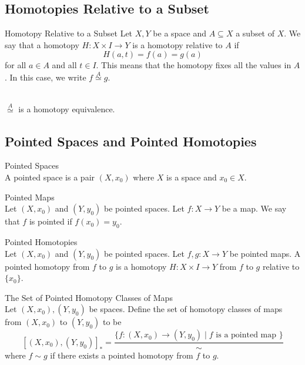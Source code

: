 \documentclass[a4paper]{article}
\begin{document}
\subsection{Homotopies Relative to a Subset}
\begin{defn}{Homotopy Relative to a Subset}{} Let $X,Y$ be a space and $A\subseteq X$ a subset of $X$. We say that a homotopy $H:X\times I\to Y$ is a homotopy relative to $A$ if $$H(a,t)=f(a)=g(a)$$ for all $a\in A$ and all $t\in I$. This means that the homotopy fixes all the values in $A$. In this case, we write $f\overset{A}{\simeq}g$. 
\end{defn}

\begin{prp}{}{}\\
$\overset{A}{\simeq}$ is a homotopy equivalence. 
\end{prp}

\subsection{Pointed Spaces and Pointed Homotopies}
\begin{defn}{Pointed Spaces}{}\\
A pointed space is a pair $(X,x_0)$ where $X$ is a space and $x_0\in X$. 
\end{defn}

\begin{defn}{Pointed Maps}{}\\
Let $(X,x_0)$ and $(Y,y_0)$ be pointed spaces. Let $f:X\to Y$ be a map. We say that $f$ is pointed if $f(x_0)=y_0$. 
\end{defn}

\begin{defn}{Pointed Homotopies}{}\\
Let $(X,x_0)$ and $(Y,y_0)$ be pointed spaces. Let $f,g:X\to Y$ be pointed maps. A pointed homotopy from $f$ to $g$ is a homotopy $H:X\times I\to Y$ from $f$ to $g$ relative to $\{x_0\}$. 
\end{defn}

\begin{defn}{The Set of Pointed Homotopy Classes of Maps}{}\\
Let $(X,x_0),(Y,y_0)$ be spaces. Define the set of homotopy classes of maps from $(X,x_0)$ to $(Y,y_0)$ to be $$[(X,x_0),(Y,y_0)]_\ast=\frac{\{f:(X,x_0)\to(Y,y_0)\;|\;f\text{ is a pointed map }\}}{\sim}$$ where $f\sim g$ if there exists a pointed homotopy from $f$ to $g$. 
\end{defn}
\end{document}

